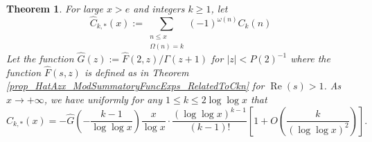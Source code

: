 \documentclass[11pt,reqno,a4letter]{article}
\numberwithin{figure}{section}
\numberwithin{table}{section}
\theoremstyle{plain}
\newtheorem{theorem}{Theorem}
\numberwithin{theorem}{section}
\theoremstyle{definition}
\renewcommand{\Re}{\operatorname{Re}}
\begin{document}
\begin{theorem} 
\label{theorem_CnkSpCasesScaledSummatoryFuncs} 
For large $x > e$ and integers $k \geq 1$, let 
\[
\widehat{C}_{k,\ast}(x) := \sum_{\substack{n \leq x \\ \Omega(n) = k}} 
     (-1)^{\omega(n)} C_k(n) 
\]
Let the function $\widehat{G}(z) := \widehat{F}(2, z) / \Gamma(z+1)$ for 
$|z| < P(2)^{-1}$ where the function $\widehat{F}(s, z)$ is defined as 
in Theorem \ref{prop_HatAzx_ModSummatoryFuncExps_RelatedToCkn} for $\Re(s) > 1$. 
As $x \rightarrow +\infty$, we have uniformly for any $1 \leq k \leq 2\log\log x$ that 
\[
\widehat{C}_{k,\ast}(x) = -\widehat{G}\left(-\frac{k-1}{\log\log x}\right) \frac{x}{\log x} \cdot 
     \frac{(\log\log x)^{k-1}}{(k-1)!} \left[ 
     1 + O\left(\frac{k}{(\log\log x)^2}\right)\right]. 
\]
\end{theorem} 
\end{document}
